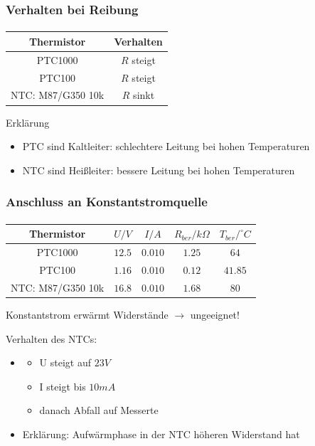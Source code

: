 \begin{frame}
    \frametitle{Verhalten bei Reibung}
    \framesubtitle{}
        \begin{center}
            \begin{tabular}{c|c}
                Thermistor & Verhalten \\
                \hline
                PTC1000 & $R$ steigt\\
                PTC100 & $R$ steigt\\
                NTC: M87/G350 10k & $R$ sinkt
            \end{tabular}
        \end{center}
        \pause
        \begin{block}{Erklärung}
             \begin{itemize}
                 \item PTC sind Kaltleiter: schlechtere Leitung bei hohen Temperaturen
                 \item NTC sind Heißleiter: bessere Leitung bei hohen
                 Temperaturen
             \end{itemize}
        \end{block}
\end{frame}
\begin{frame}
    \frametitle{Anschluss an Konstantstromquelle}
    \framesubtitle{}
        \begin{center}
            \begin{tabular}{c|c|c|c|c}
                Thermistor & $U/V$ & $I/A$ & $R_{ber}/k\Omega$ & $T_{ber}/^{\circ}C$ \\
                \hline
                PTC1000 & $12.5$  & $0.010$ & $1.25$ &$64$\\
                PTC100  & $1.16$  & $0.010$ & $0.12$ &$41.85$\\
                NTC: M87/G350 10k & $16.8$ & $0.010$ & $1.68$ &$80$
            \end{tabular}
        \end{center}
        \begin{block}{}
            Konstantstrom erwärmt Widerstände $\rightarrow$ ungeeignet!
        \end{block}
        \begin{block}{Verhalten des NTCs:}
            \begin{itemize}
                \item 
                \begin{itemize}
                    \item U steigt auf $23V$
                    \item I steigt bis $10mA$
                    \item danach Abfall auf Messerte
                \end{itemize}
                \item Erklärung: Aufwärmphase in der NTC höheren Widerstand hat
            \end{itemize}
        \end{block}
\end{frame}
